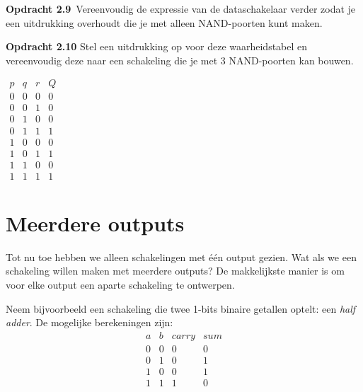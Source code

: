 \documentclass[11pt,a5paper]{report}
\begin{document}
\begin{framed}
\textbf{Opdracht 2.9}\
Vereenvoudig de expressie van de dataschakelaar verder zodat je een uitdrukking overhoudt die je met alleen NAND-poorten kunt maken.
\end{framed}

\begin{framed}
\noindent
\begin{minipage}[t]{0.65\textwidth}
\textbf{Opdracht 2.10}
Stel een uitdrukking op voor deze waarheidstabel en vereenvoudig deze naar een schakeling die je met 3 NAND-poorten kan bouwen.
\end{minipage}%
\hfill
\begin{minipage}[t]{0.20\textwidth}
\vspace*{-1em}
\begin{center}
\(
\begin{array}{ccc|c}
p & q & r & Q \\
\hline
0 & 0 & 0 & 0 \\
0 & 0 & 1 & 0 \\
0 & 1 & 0 & 0 \\
0 & 1 & 1 & 1 \\
1 & 0 & 0 & 0 \\
1 & 0 & 1 & 1 \\
1 & 1 & 0 & 0 \\
1 & 1 & 1 & 1
\end{array}
\)
\end{center}
\end{minipage}
\end{framed}








\section*{Meerdere outputs}

Tot nu toe hebben we alleen schakelingen met één output gezien. Wat als we een schakeling willen maken met meerdere outputs? De makkelijkste manier is om voor elke output een aparte schakeling te ontwerpen.



Neem bijvoorbeeld een schakeling die twee 1-bits binaire getallen optelt: een \textit{half adder}. De mogelijke berekeningen zijn:
\[
\begin{array}{cc|cc}
a & b & carry & sum \\ \hline
0 & 0 & 0 & 0 \\
0 & 1 & 0 & 1 \\
1 & 0 & 0 & 1 \\
1 & 1 & 1 & 0
\end{array}
\]
\end{document}
